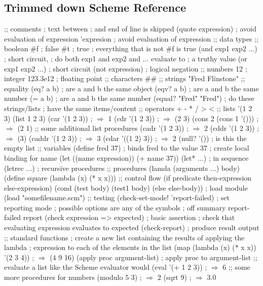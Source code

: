 \documentclass[10pt,a4paper,landscape,english,twoside]{article}
\begin{document}
\begin{multicols}{2}
\section*{Trimmed down Scheme Reference}
\begin{schemecode}
;; comments
; text between ; and end of line is skipped
(quote expression) ; avoid evaluation of expression
'expresion ; avoid evaluation of expression
;; data types
;; boolean
#f ; false
#t ; true ; everything that is not #f is true
(and exp1 exp2 ...) ; short circuit, 
; do both exp1 and exp2 and ...  evaluate to 
; a truthy value
(or exp1 exp2 ...) ; short circuit
(not expression) ; logical negation
;; numbers
12 ; integer
123.3e12 ; floating point
;; characters
#\a #\newline
;; strings
"Fred Flinstone"
;; equality
(eq? a b) ; are a and b the same object
(eqv? a b) ; are a and b the same number
(= a b) ; are a and b the same number
(equal? "Fred" "Fred") ; do these strings/lists 
; have the same items/content 
;; operators
+ - * / > <
;; lists
'(1 2 3)
(list 1 2 3)
(car '(1 2 3)) ; $\Rightarrow$ 1
(cdr '(1 2 3)) ; $\Rightarrow$ (2 3)
(cons 2 (cons 1 '())) ; $\Rightarrow$ (2 1)
;; some additional list procedures
(cadr '(1 2 3)) ; $\Rightarrow$ 2
(cddr '(1 2 3)) ; $\Rightarrow$ (3)
(caddr '(1 2 3)) ; $\Rightarrow$ 3
(cdar '((1 2) 3)) ; $\Rightarrow$ 2
(null? '()) ; is this the empty list
;; variables
(define fred 37) ; binds fred to the value 37
; create local binding for name
(let ((name expression)) (+ name 37)) 
(let* ...) ; in sequence
(letrec ...) ; recursive procedures
;; procedures
(lamda (arguments ...) body)
(define square (lambda (x) (* x x)))
;; control flow
(if predicate then-expression else-expression)
(cond (test body)
  (test1 body)
  (else else-body))
; load module
(load "somefilename.scm")
;; testing 
(check-set-mode! 'report-failed) ; set reporting mode
; possible options are any of the symbols 
; off summary report-failed report 
(check expression => expected) ; basic assertion 
; check that evaluating expression evaluates to expected
(check-report) ; produce result output
;; standard functions
; create a new list containing the results of applying the lambda 
; expression to each of the elements in the list
(map (lambda (x) (* x x)) '(2 3 4)) ; $\Rightarrow$ (4 9 16) 
(apply proc argument-list) ; apply proc to argument-list
;; evaluate a list like the Scheme evaluator would
(eval '(+ 1 2 3)) ; $\Rightarrow$ 6 
;; some more procedures for numbers
(modulo 5 3) ; $\Rightarrow$ 2
(sqrt 9) ; $\Rightarrow$ 3.0

\end{schemecode}
\end{multicols}
\end{document}
